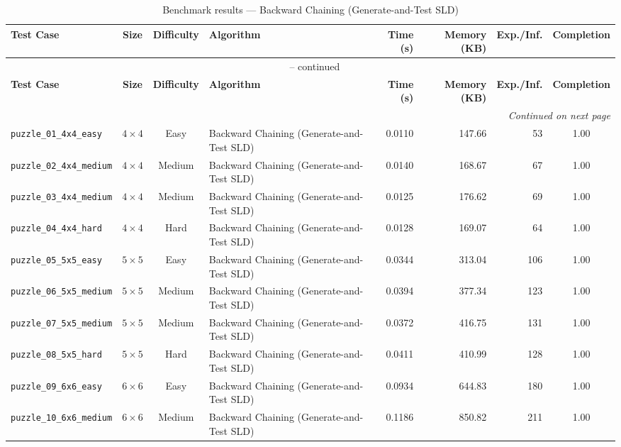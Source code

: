 \documentclass{article}
\begin{document}
\begin{longtable}{@{}lccl r r r c@{}}
  \caption{Benchmark results — Backward Chaining (Generate-and-Test SLD)} \label{tab:backward_chaining__generate_and_test_sld} \\
  \toprule
  \textbf{Test Case} & \textbf{Size} & \textbf{Difficulty} & \textbf{Algorithm} & \textbf{Time (s)} & \textbf{Memory (KB)} & \textbf{Exp./Inf.} & \textbf{Completion} \\
  \midrule
  \endfirsthead
  \multicolumn{8}{c}{\tablename\ \thetable{} -- continued} \\
  \toprule
  \textbf{Test Case} & \textbf{Size} & \textbf{Difficulty} & \textbf{Algorithm} & \textbf{Time (s)} & \textbf{Memory (KB)} & \textbf{Exp./Inf.} & \textbf{Completion} \\
  \midrule
  \endhead
  \midrule
  \multicolumn{8}{r}{\textit{Continued on next page}} \\
  \endfoot
  \bottomrule
  \endlastfoot
  \texttt{puzzle\_01\_4x4\_easy} & $4\times4$ & Easy & Backward Chaining (Generate-and-Test SLD) & 0.0110 & 147.66 & 53 & 1.00 \\
  \texttt{puzzle\_02\_4x4\_medium} & $4\times4$ & Medium & Backward Chaining (Generate-and-Test SLD) & 0.0140 & 168.67 & 67 & 1.00 \\
  \texttt{puzzle\_03\_4x4\_medium} & $4\times4$ & Medium & Backward Chaining (Generate-and-Test SLD) & 0.0125 & 176.62 & 69 & 1.00 \\
  \texttt{puzzle\_04\_4x4\_hard} & $4\times4$ & Hard & Backward Chaining (Generate-and-Test SLD) & 0.0128 & 169.07 & 64 & 1.00 \\
  \texttt{puzzle\_05\_5x5\_easy} & $5\times5$ & Easy & Backward Chaining (Generate-and-Test SLD) & 0.0344 & 313.04 & 106 & 1.00 \\
  \texttt{puzzle\_06\_5x5\_medium} & $5\times5$ & Medium & Backward Chaining (Generate-and-Test SLD) & 0.0394 & 377.34 & 123 & 1.00 \\
  \texttt{puzzle\_07\_5x5\_medium} & $5\times5$ & Medium & Backward Chaining (Generate-and-Test SLD) & 0.0372 & 416.75 & 131 & 1.00 \\
  \texttt{puzzle\_08\_5x5\_hard} & $5\times5$ & Hard & Backward Chaining (Generate-and-Test SLD) & 0.0411 & 410.99 & 128 & 1.00 \\
  \texttt{puzzle\_09\_6x6\_easy} & $6\times6$ & Easy & Backward Chaining (Generate-and-Test SLD) & 0.0934 & 644.83 & 180 & 1.00 \\
  \texttt{puzzle\_10\_6x6\_medium} & $6\times6$ & Medium & Backward Chaining (Generate-and-Test SLD) & 0.1186 & 850.82 & 211 & 1.00 \\

\end{longtable}
\end{document}
